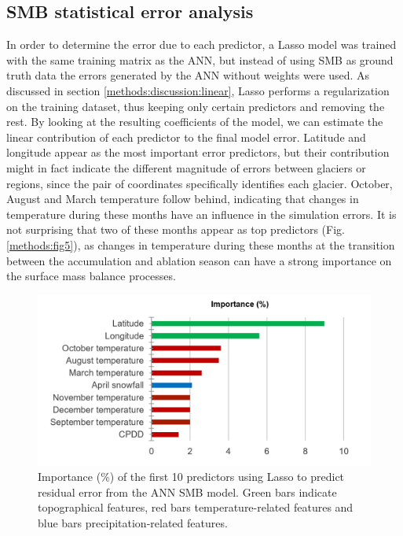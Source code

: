 \subsection{SMB statistical error analysis}

In order to determine the error due to each predictor, a Lasso model was trained with the same training matrix as the ANN, but instead of using SMB as ground truth data the errors generated by the ANN without weights were used. As discussed in section \ref{methods:discussion:linear}, Lasso performs a regularization on the training dataset, thus keeping only certain predictors and removing the rest. By looking at the resulting coefficients of the model, we can estimate the linear contribution of each predictor to the final model error. Latitude and longitude appear as the most important error predictors, but their contribution might in fact indicate the different magnitude of errors between glaciers or regions, since the pair of coordinates specifically identifies each glacier. October, August and March temperature follow behind, indicating that changes in temperature during these months have an influence in the simulation errors. It is not surprising that two of these months appear as top predictors (Fig. \ref{methods:fig5}), as changes in temperature during these months at the transition between the accumulation and ablation season can have a strong importance on the surface mass balance processes. 

\begin{figure}[h]
\centering
\includegraphics[width=12cm]{Figures/methods/Figure_S1.png}
\caption{Importance (\%) of the first 10 predictors using Lasso to predict residual error from the ANN SMB model. Green bars indicate topographical features, red bars temperature-related features and blue bars precipitation-related features.}
\label{methods:figS1}
\end{figure}

